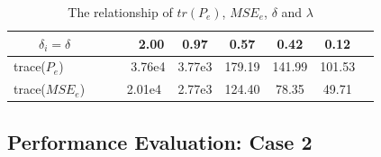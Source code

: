 \documentclass[journal,transmag]{IEEEtran}
\begin{document}
{	\begin{table}[htp]
		\centering
		\caption{The relationship of $tr(P_e)$, $MSE_e$,   $\delta$ and $\lambda$}\label{table_compare}
		{
			\begin{tabular}{lccccc}  %
				\hline
				$\quad\quad\delta_{i}=\delta\quad\quad\quad\quad\quad$ 2.00&0.97&0.57&0.42& 0.12&\\ \hline  %
				trace($P_e$)$\quad\quad\qquad\quad$ 3.76e4&3.77e3&179.19&141.99&101.53 &   \\       %
				\hline  %
				trace($MSE_e$)$\qquad\quad$ 2.01e4&2.77e3&124.40&78.35&49.71 &   \\  \hline       %
			\end{tabular}
		}
	\end{table}
	
	

	
	\subsection{Performance Evaluation: Case 2}
	
}
\end{document}
